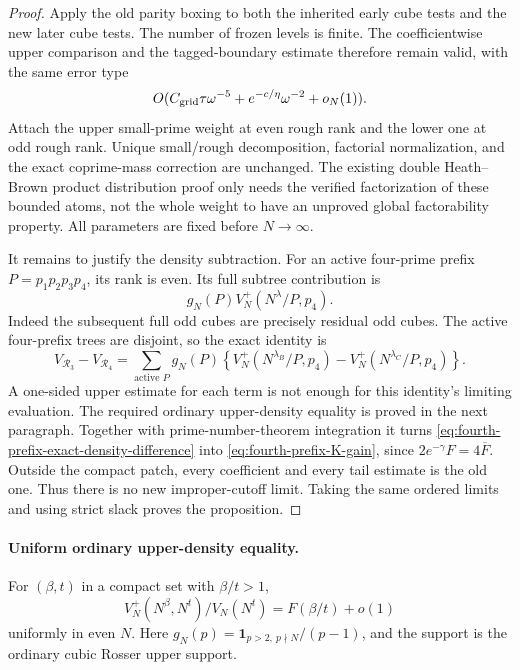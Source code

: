 \documentclass[11pt]{article}
\begin{document}
\begin{proof}
Apply the old parity boxing to both the inherited early cube tests
and the new later cube tests. The number of frozen levels is finite.
The coefficientwise upper comparison and the tagged-boundary estimate
therefore remain valid, with the same error type
\[
 O(C_{\rm grid}\tau\omega^{-5}
        +e^{-c/\eta}\omega^{-2}+o_N(1)).
\]
Attach the upper small-prime weight at even rough rank and the lower
one at odd rough rank. Unique small/rough decomposition, factorial
normalization, and the exact coprime-mass correction are unchanged.
The existing double Heath--Brown product distribution proof only
needs the verified factorization of these bounded atoms, not the
whole weight to have an unproved global factorability property.
All parameters are fixed before \(N\to\infty\).

It remains to justify the density subtraction.
For an active four-prime prefix \(P=p_1p_2p_3p_4\), its rank is even.
Its full subtree contribution is
\[
 g_N(P)V_N^+(N^\lambda/P,p_4).
\]
Indeed the subsequent full odd cubes are precisely residual odd cubes.
The active four-prefix trees are disjoint, so the exact identity is
\begin{equation}\label{eq:fourth-prefix-exact-density-difference}
 V_{\mathcal R_3}-V_{\mathcal R_4}
 =\sum_{\text{active }P}g_N(P)
 \left\{V_N^+(N^{\lambda_B}/P,p_4)
              -V_N^+(N^{\lambda_C}/P,p_4)\right\}.
\end{equation}
A one-sided upper estimate for each term is not enough for this
identity's limiting evaluation. The required ordinary upper-density
equality is proved in the next paragraph.
Together with prime-number-theorem integration it turns
\eqref{eq:fourth-prefix-exact-density-difference} into
\eqref{eq:fourth-prefix-K-gain}, since
\(2e^{-\gamma}F=4\overline F\).
Outside the compact patch, every coefficient and every tail estimate
is the old one. Thus there is no new improper-cutoff limit.
Taking the same ordered limits and using strict slack proves the
proposition.
\end{proof}

\paragraph{Uniform ordinary upper-density equality.}
For \((\beta,t)\) in a compact set with \(\beta/t>1\),
\[
 V_N^+(N^\beta,N^t)/V_N(N^t)=F(\beta/t)+o(1)
\]
uniformly in even \(N\). Here \(g_N(p)=
\mathbf1_{p>2,\ p\nmid N}/(p-1)\), and the support is the ordinary
cubic Rosser upper support.
\end{document}
